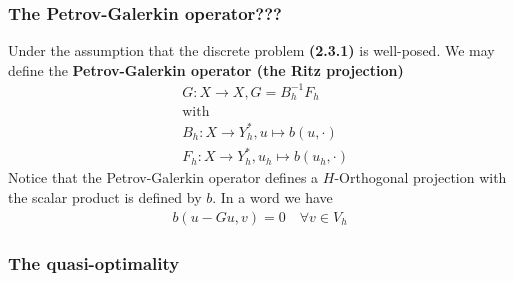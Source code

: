 \documentclass[a4paper,12pt,oneside,fleqn]{book}
\theoremstyle{definition}
\theoremstyle{remark}
\begin{document}
\subsubsection{The Petrov-Galerkin operator???}
Under the assumption that the discrete problem \textbf{(2.3.1)} is well-posed. We may define the \textbf{Petrov-Galerkin operator (the Ritz projection)}
\begin{align*}
	& G: X \rightarrow X, G = B_h^{-1} F_h\\
	&\text{with}\\
	& B_h: X \rightarrow Y_h^*,  u \mapsto b(u, \cdot )\\
	& F_h: X \rightarrow Y_h^*,  u_h \mapsto b(u_h, \cdot)
\end{align*}
Notice that the Petrov-Galerkin operator defines a $H$-Orthogonal projection with the scalar product is defined by $b$. In a word we have
\begin{align*}
	b(u - Gu, v) = 0 \quad \forall v \in V_h
\end{align*}



\subsubsection{The quasi-optimality}
\end{document}
